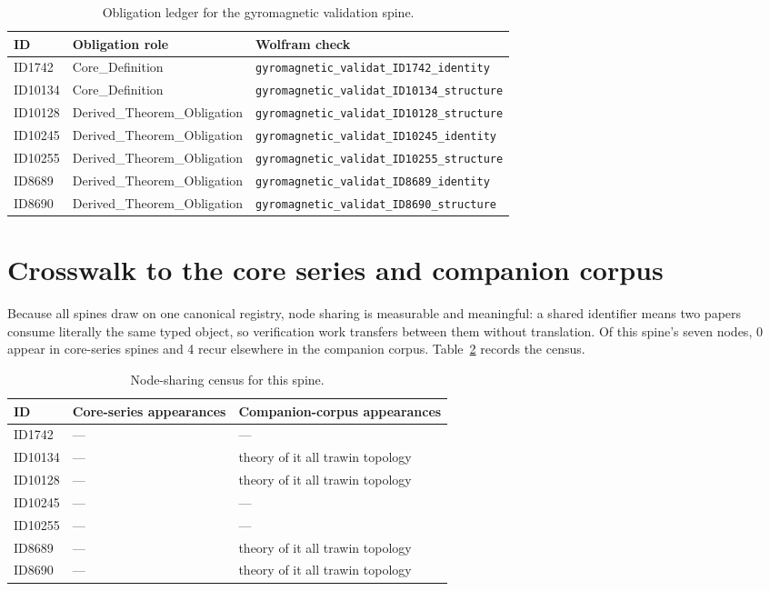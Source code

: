 \documentclass[11pt]{article}
\theoremstyle{remark}
\begin{document}
\begin{table}[ht]
\centering
\small
\caption{Obligation ledger for the gyromagnetic validation spine.}
\label{tab:obligations}
\begin{tabular}{llp{6.2cm}}
\toprule
ID & Obligation role & Wolfram check \\
\midrule
ID1742 & Core\_Definition & \texttt{gyromagnetic\_validat\_ID1742\_identity} \\
ID10134 & Core\_Definition & \texttt{gyromagnetic\_validat\_ID10134\_structure} \\
ID10128 & Derived\_Theorem\_Obligation & \texttt{gyromagnetic\_validat\_ID10128\_structure} \\
ID10245 & Derived\_Theorem\_Obligation & \texttt{gyromagnetic\_validat\_ID10245\_identity} \\
ID10255 & Derived\_Theorem\_Obligation & \texttt{gyromagnetic\_validat\_ID10255\_structure} \\
ID8689 & Derived\_Theorem\_Obligation & \texttt{gyromagnetic\_validat\_ID8689\_identity} \\
ID8690 & Derived\_Theorem\_Obligation & \texttt{gyromagnetic\_validat\_ID8690\_structure} \\
\bottomrule
\end{tabular}
\end{table}

\section{Crosswalk to the core series and companion corpus}
\label{sec:crosswalk}

Because all spines draw on one canonical registry, node sharing is measurable and meaningful: a shared identifier means two papers consume literally the same typed object, so verification work transfers between them without translation. Of this spine's seven nodes, 0 appear in core-series spines and 4 recur elsewhere in the companion corpus. Table~\ref{tab:crosswalk} records the census.

\begin{table}[ht]
\centering
\small
\caption{Node-sharing census for this spine.}
\label{tab:crosswalk}
\begin{tabular}{lp{4.4cm}p{6.6cm}}
\toprule
ID & Core-series appearances & Companion-corpus appearances \\
\midrule
ID1742 & --- & --- \\
ID10134 & --- & theory of it all trawin topology \\
ID10128 & --- & theory of it all trawin topology \\
ID10245 & --- & --- \\
ID10255 & --- & --- \\
ID8689 & --- & theory of it all trawin topology \\
ID8690 & --- & theory of it all trawin topology \\
\bottomrule
\end{tabular}
\end{table}
\end{document}
